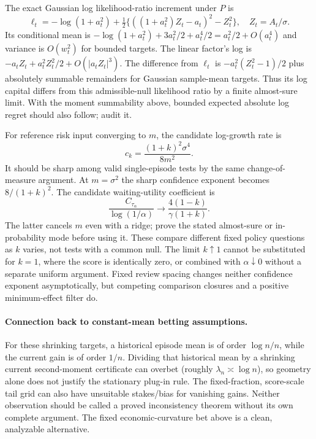 The exact Gaussian log likelihood-ratio increment under $P$ is
\[
 \ell_t=-\log(1+a_t^2)
       +\tfrac12\{((1+a_t^2)Z_t-a_t)^2-Z_t^2\},
 \quad Z_t=A_t/\sigma.
\]
Its conditional mean is $-\log(1+a_t^2)+3a_t^2/2+a_t^4/2
=a_t^2/2+O(a_t^4)$ and variance is $O(w_t^2)$ for bounded targets.
The linear factor's log is $-a_tZ_t+a_t^2Z_t^2/2+O(|a_tZ_t|^3)$.
The difference from $\ell_t$ is
$-a_t^2(Z_t^2-1)/2$ plus absolutely summable remainders for Gaussian
sample-mean targets. Thus its log capital differs from this admissible-null
likelihood ratio by a finite almost-sure limit. With the moment summability
above, bounded expected absolute log regret should also follow; audit it.

For reference risk input converging to $m$, the candidate log-growth rate is
\[
 c_k=\frac{(1+k)^2\sigma^4}{8m^2}.
\]
It should be sharp among valid single-episode tests by the same change-of-
measure argument. At $m=\sigma^2$ the sharp confidence exponent becomes
$8/(1+k)^2$. The candidate waiting-utility coefficient is
\[
 \frac{C_{\tau_\alpha}}{\log(1/\alpha)}
 \longrightarrow\frac{4(1-k)}{\gamma(1+k)}.
\]
The latter cancels $m$ even with a ridge; prove the stated almost-sure or
in-probability mode before using it. These compare different fixed policy
questions as $k$ varies, not tests with a common null. The limit $k\uparrow1$
cannot be substituted for $k=1$, where the score is identically zero, or
combined with $\alpha\downarrow0$ without a separate uniform argument.
Fixed review spacing changes neither confidence exponent asymptotically,
but competing comparison closures and a positive minimum-effect filter do.

\paragraph{Connection back to constant-mean betting assumptions.}
For these shrinking targets, a historical episode mean is of order
$\log n/n$, while the current gain is of order $1/n$. Dividing that
historical mean by a shrinking current second-moment certificate can overbet
(roughly $\lambda_n\asymp\log n$), so geometry alone does not justify the
stationary plug-in rule. The fixed-fraction, score-scale tail grid can also
have unsuitable stakes/bias for vanishing gains. Neither observation should
be called a proved inconsistency theorem without its own complete argument.
The fixed economic-curvature bet above is a clean, analyzable alternative.
